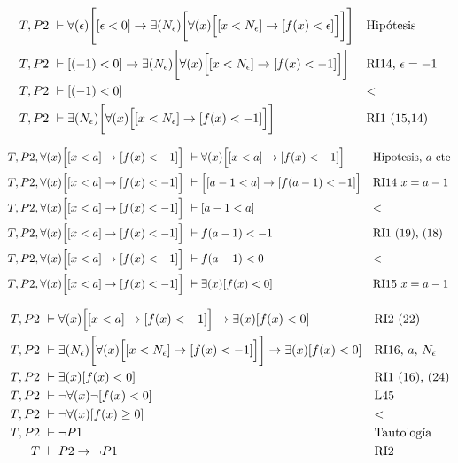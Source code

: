 \documentclass[14pt]{extarticle}
\begin{document}
\newpage
\begin{adjustwidth}{-1cm}{0pt}
\begin{align}
    T, P2 \, \, &\vdash \forall (\epsilon)\Biggl[ [\epsilon < 0] \rightarrow  \exists(N_\epsilon) \biggl[  \forall(x) \Bigl[   [x < N_\epsilon] \rightarrow [f(x) < \epsilon] \Bigr] \biggr]   \Biggr] &&\text{Hipótesis} \\
    T, P2 \, \, &\vdash [(-1) < 0] \rightarrow  \exists(N_\epsilon) \biggl[  \forall(x) \Bigl[   [x < N_\epsilon] \rightarrow [f(x) < -1] \Bigr] \biggr] &&\text{RI14, $\epsilon = -1$ }   \\
    T, P2 \, \, &\vdash [(-1) < 0] &&\text{$<$} \\
    T, P2 \, \, &\vdash \exists(N_\epsilon) \biggl[  \forall(x) \Bigl[   [x < N_\epsilon] \rightarrow [f(x) < -1] \Bigr] \biggr]   &&\text{RI1 (15,14)} 
\end{align}
\end{adjustwidth}
\begin{adjustwidth}{-1cm}{0pt}
\begin{align}    
    T, P2, \forall(x) \Bigl[   [x < a] \rightarrow [f(x) < -1] \Bigr]  \, \, &\vdash \forall(x) \Bigl[   [x < a] \rightarrow [f(x) < -1] \Bigr] &&\text{Hipotesis, $a$ cte} \\
    T, P2, \forall(x) \Bigl[   [x < a] \rightarrow [f(x) < -1] \Bigr] \, \, &\vdash \Bigl[   [a-1 < a] \rightarrow [f(a-1) < -1] \Bigr] && \text{RI14 $x = a-1$ } \\
    T, P2, \forall(x) \Bigl[   [x < a] \rightarrow [f(x) < -1] \Bigr] \, \, &\vdash [a-1 < a] &&\text{$<$} \\
    T, P2, \forall(x) \Bigl[   [x < a] \rightarrow [f(x) < -1] \Bigr] \, \, &\vdash f(a-1) < -1 &&\text{RI1 (19), (18)}\\
    T, P2, \forall(x) \Bigl[   [x < a] \rightarrow [f(x) < -1] \Bigr] \, \, &\vdash f(a-1) < 0 &&\text{$<$} \\
    T, P2, \forall(x) \Bigl[   [x < a] \rightarrow [f(x) < -1] \Bigr] \, \, &\vdash \exists(x)[f(x)<0] &&\text{RI15 $x= a-1$}
\end{align}
\end{adjustwidth}
\begin{adjustwidth}{-1cm}{0pt}
\begin{align}
    T, P2  \, \, &\vdash \forall(x) \Bigl[   [x < a] \rightarrow [f(x) < -1] \Bigr] \rightarrow \exists(x)[f(x)<0] &&\text{RI2 (22)} \\
    T, P2  \, \, &\vdash \exists(N_\epsilon) \biggl[  \forall(x) \Bigl[   [x < N_\epsilon] \rightarrow [f(x) < -1] \Bigr] \biggr] \rightarrow \exists(x)[f(x)<0] &&\text{RI16, $a$, $N_\epsilon$} \\
    T, P2 \, \, &\vdash \exists(x)[f(x)<0] &&\text{RI1 (16), (24)} \\
    T, P2 \, \, &\vdash \lnot \forall(x)\lnot[f(x) < 0] &&\text{L45} \\
    T, P2 \, \, &\vdash \lnot \forall(x)[f(x) \geq 0] &&\text{$<$} \\
    T, P2 \, \, &\vdash \lnot P1 &&\text{Tautología} \\
    T \, \, &\vdash P2 \rightarrow \lnot P1 &&\text{RI2} 
\end{align}  
\end{adjustwidth}
\end{document}
